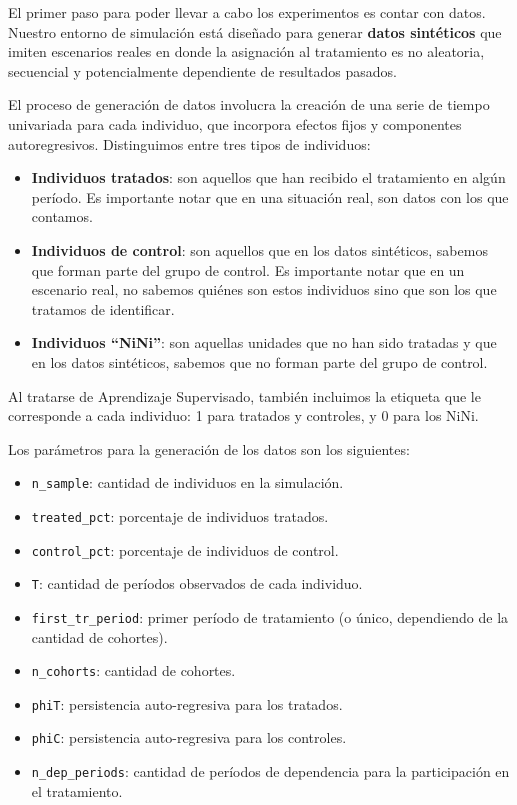 \documentclass[../../main.tex]{subfiles}
\begin{document}

El primer paso para poder llevar a cabo los experimentos es contar con datos. Nuestro
entorno de simulación está diseñado para generar \textbf{datos sintéticos} que imiten
escenarios reales en donde la asignación al tratamiento es no aleatoria, secuencial y
potencialmente dependiente de resultados pasados.

El proceso de generación de datos involucra la creación de una serie de tiempo univariada
para cada individuo, que incorpora efectos fijos y componentes autoregresivos. Distinguimos
entre tres tipos de individuos:
\begin{itemize}[itemsep=0.1cm]
    \item \textbf{Individuos tratados}: son aquellos que han recibido el tratamiento en
    algún período. Es importante notar que en una situación real, son datos con los que
    contamos.
    \item \textbf{Individuos de control}: son aquellos que en los datos sintéticos, sabemos
    que forman parte del grupo de control. Es importante notar que en un escenario real,
    no sabemos quiénes son estos individuos sino que son los que tratamos de identificar.
    \item \textbf{Individuos ``NiNi''}: son aquellas unidades que no han sido tratadas y
    que en los datos sintéticos, sabemos que no forman parte del grupo de control.
\end{itemize}

Al tratarse de Aprendizaje Supervisado, también incluimos la etiqueta que le corresponde a
cada individuo: 1 para tratados y controles, y 0 para los NiNi.

Los parámetros para la generación de los datos son los siguientes:
\begin{itemize}[itemsep=0.1cm]
    \item \texttt{n\_sample}: cantidad de individuos en la simulación.
    \item \texttt{treated\_pct}: porcentaje de individuos tratados.
    \item \texttt{control\_pct}: porcentaje de individuos de control.
    \item \texttt{T}: cantidad de períodos observados de cada individuo.
    \item \texttt{first\_tr\_period}: primer período de tratamiento (o único, dependiendo
    de la cantidad de cohortes).
    \item \texttt{n\_cohorts}: cantidad de cohortes.
    \item \texttt{phiT}: persistencia auto-regresiva para los tratados.
    \item \texttt{phiC}: persistencia auto-regresiva para los controles.
    \item \texttt{n\_dep\_periods}: cantidad de períodos de dependencia para la
    participación en el tratamiento.
\end{itemize}
\end{document}
